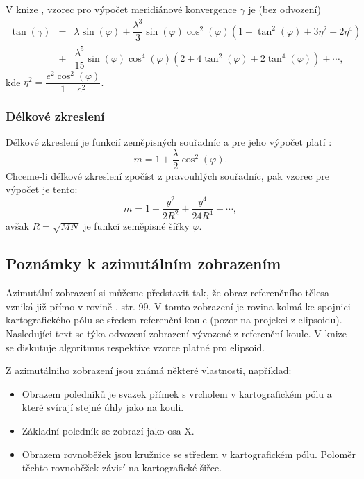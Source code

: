 \documentclass[11pt,a4paper]{article}
\begin{document}
V knize \cite{Buchar2002}, vzorec pro výpočet meridiánové konvergence $\gamma$ je (bez odvození)
\begin{eqnarray}
\tan{\left(\gamma\right)} &=& \lambda\sin{\left(\varphi\right)} + \dfrac{\lambda^{3}}{3}\sin{\left(\varphi\right)} \cos^{2}{\left(\varphi\right)}\left(1+\tan^{2}{\left(\varphi\right)} + 3\eta^{2} + 2\eta^{4} \right)  \\ \nonumber
                         &+&\dfrac{\lambda^{5}}{15}\sin{\left(\varphi\right)} \cos^{4}{\left(\varphi\right)}\left(2+4\tan^{2}{\left(\varphi\right)} +2\tan^{4}{\left(\varphi\right)} \right) + \cdots, \nonumber
\end{eqnarray}
kde $\eta^{2} = \dfrac{e^{2}\cos^{2}{\left(\varphi\right)}}{1-e^{2}}$.

\subsubsection*{Délkové zkreslení}
Délkové zkreslení je funkcií zeměpisných souřadníc a pre jeho výpočet platí \cite{Buchar2002}:
\begin{equation}
m = 1+\dfrac{\lambda}{2}\cos^{2}{\left(\varphi\right)}.
\end{equation}
Chceme-li délkové zkreslení zpočíst z pravouhlých souřadníc, pak vzorec pre výpočet je tento:
\begin{equation}
m = 1+\dfrac{y^{2}}{2R^{2}} + \dfrac{y^{4}}{24R^{4}} + \cdots,
\end{equation}
avšak $R = \sqrt{MN}$ je funkcí zeměpisné šířky $\varphi$.



\subsection{Poznámky k azimutálním zobrazením}

Azimutální zobrazení si můžeme představit tak, že obraz referenčního tělesa vzniká již přímo v rovině \cite{Buchar2002}, str. 99. V tomto zobrazení je rovina kolmá ke spojnici kartografického pólu se sředem referenční koule (pozor na projekci z elipsoidu). Nasledujíci text se týka odvození zobrazení vývozené z referenční koule. V knize \cite{Snyder1987} se diskutuje algoritmus respektíve vzorce platné pro elipsoid.

Z azimutálniho zobrazení jsou známá některé vlastnosti, například:

\begin{itemize}
\item Obrazem poledníků je svazek přímek s vrcholem v kartografickém pólu a které svírají stejné úhly jako na kouli.
\item Základní poledník se zobrazí jako osa X.
\item Obrazem rovnoběžek jsou kružnice se středem v kartografickém pólu. Poloměr těchto rovnoběžek závisí na kartografické šiřce.
\end{itemize} 
\end{document}

